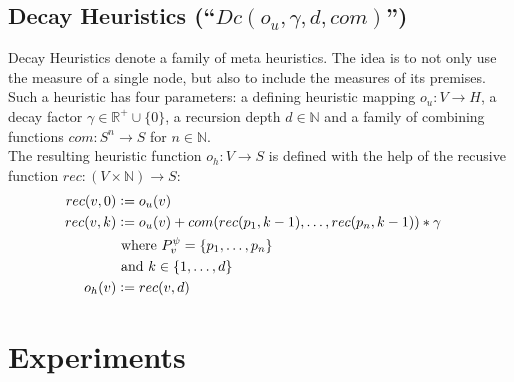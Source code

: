 \documentclass{llncs}
\newcommand{\defeq}{\mathrel{\mathop:}=}
\begin{document}
\subsection{Decay Heuristics (``$Dc(o_u,\gamma,d,com)$'') }
\label{sec:decay}
Decay Heuristics denote a family of meta heuristics. 
The idea is to not only use the measure of a single node, but also to include the measures of its premises.
Such a heuristic has four parameters: a defining heuristic mapping $o_u: V \rightarrow H$, a decay factor $\gamma \in \mathbb{R}^+ \cup \{0\}$, a recursion depth $d \in \mathbb{N}$ and a family of combining functions $com: S^n \rightarrow S$ for $n \in \mathbb{N}$.\\
The resulting heuristic function $o_h: V \rightarrow S$ is defined with the help of the recusive function $rec: (V \times \mathbb{N}) \rightarrow S$:
\begin{align*}
	rec(\n,0) &\defeq o_u(\n) \\
	rec(\n,k) &\defeq o_u(\n) + com(rec(p_1,k-1),\ldots,rec(p_n,k-1)) * \gamma\\
	& \text{ where } \Premises{\n}{\psi} = \{p_1,\ldots,p_n\}\\
	& \text{ and } k \in \{1,\ldots,d\} \\
	o_h(\n) &\defeq rec(\n,d) &
\end{align*}


\section{Experiments} 
\label{sec:exp}
\end{document}
